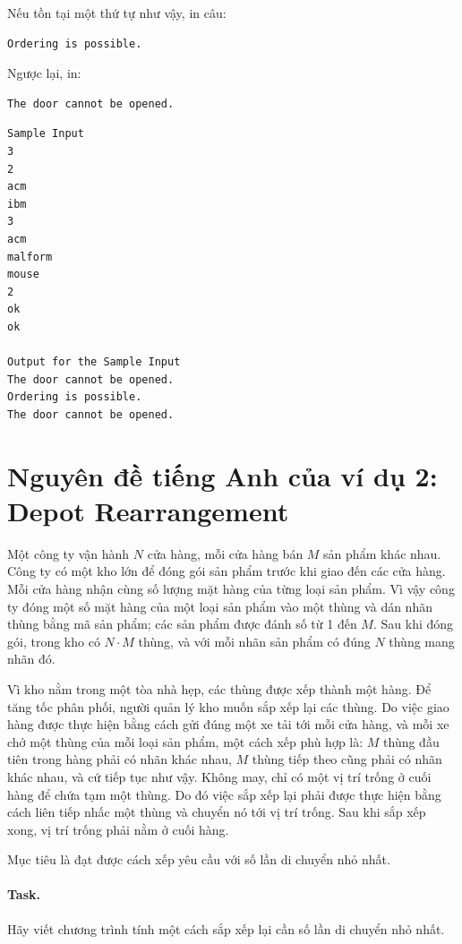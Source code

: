 \documentclass[11pt]{article}
\begin{document}
Nếu tồn tại một thứ tự như vậy, in câu:
\begin{verbatim}
Ordering is possible.
\end{verbatim}
Ngược lại, in:
\begin{verbatim}
The door cannot be opened.
\end{verbatim}

\begin{verbatim}
Sample Input
3
2
acm
ibm
3
acm
malform
mouse
2
ok
ok

Output for the Sample Input
The door cannot be opened.
Ordering is possible.
The door cannot be opened.
\end{verbatim}

\section{Nguyên đề tiếng Anh của ví dụ 2: Depot Rearrangement}

Một công ty vận hành \(N\) cửa hàng, mỗi cửa hàng bán \(M\) sản phẩm khác nhau.
Công ty có một kho lớn để đóng gói sản phẩm trước khi giao đến các cửa hàng.
Mỗi cửa hàng nhận cùng số lượng mặt hàng của từng loại sản phẩm. Vì vậy công ty
đóng một số mặt hàng của một loại sản phẩm vào một thùng và dán nhãn thùng bằng
mã sản phẩm; các sản phẩm được đánh số từ 1 đến \(M\). Sau khi đóng gói, trong
kho có \(N\cdot M\) thùng, và với mỗi nhãn sản phẩm có đúng \(N\) thùng mang
nhãn đó.

Vì kho nằm trong một tòa nhà hẹp, các thùng được xếp thành một hàng. Để tăng
tốc phân phối, người quản lý kho muốn sắp xếp lại các thùng. Do việc giao hàng
được thực hiện bằng cách gửi đúng một xe tải tới mỗi cửa hàng, và mỗi xe chở
một thùng của mỗi loại sản phẩm, một cách xếp phù hợp là: \(M\) thùng đầu tiên
trong hàng phải có nhãn khác nhau, \(M\) thùng tiếp theo cũng phải có nhãn khác
nhau, và cứ tiếp tục như vậy. Không may, chỉ có một vị trí trống ở cuối hàng để
chứa tạm một thùng. Do đó việc sắp xếp lại phải được thực hiện bằng cách liên
tiếp nhấc một thùng và chuyển nó tới vị trí trống. Sau khi sắp xếp xong, vị trí
trống phải nằm ở cuối hàng.

Mục tiêu là đạt được cách xếp yêu cầu với số lần di chuyển nhỏ nhất.

\paragraph{Task.}
Hãy viết chương trình tính một cách sắp xếp lại cần số lần di chuyển nhỏ nhất.
\end{document}
